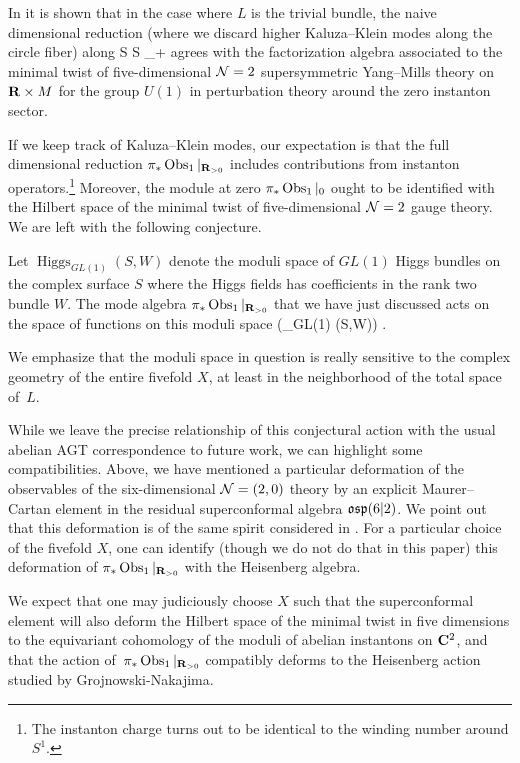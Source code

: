 In \cite{SWtensor} it is shown that in the case where $L$ is the trivial bundle, the naive dimensional reduction (where we discard higher Kaluza--Klein modes along the circle fiber) along 
\beqn
S \times \C \to S \times \R_+
\eeqn
agrees with the factorization algebra associated to the minimal twist of five-dimensional $\mathcal N = 2$ supersymmetric Yang--Mills theory on $\mathbf{R}\times M$ for the group $U(1)$ in perturbation theory around the zero instanton sector.

If we keep track of Kaluza--Klein modes, our expectation is that the full dimensional reduction $\pi_{*}\operatorname{Obs}_{1}|_{\mathbf{R}_{>0}}$ includes contributions from instanton operators.\footnote{The instanton charge turns out to be identical to the winding number around $S^1$.} Moreover, the module at zero $\pi_{*}\operatorname{Obs}_{1}|_{0}$ ought to be identified with the Hilbert space of the minimal twist of five-dimensional $\mathcal N = 2$ gauge theory. We are left with the following conjecture.

\begin{conj}
\label{conj:AGT1}
Let $\operatorname{Higgs}_{GL(1)} (S,W)$ denote the moduli space of $GL(1)$ Higgs bundles on the complex surface $S$ where the Higgs fields has coefficients in the rank two bundle $W$.
The mode algebra $\pi_{*}\operatorname{Obs}_{1}|_{\mathbf{R}_{>0}}$ that we have just discussed acts on the space of functions on this moduli space
\beqn
\cO \left(_{GL(1)} (S,W)\right) .
\eeqn
\end{conj}

We emphasize that the moduli space in question is really sensitive to the complex geometry of the entire fivefold $X$, at least in the neighborhood of the total space of~$L$.

While we leave the precise relationship of this conjectural action with the usual abelian AGT correspondence to future work, we can highlight some compatibilities. Above, we have mentioned a particular deformation of the observables of the six-dimensional $\mathcal N = (2,0)$ theory by an explicit Maurer--Cartan element in the residual superconformal algebra $\mathfrak{osp}(6|2)$. We point out that this deformation is of the same spirit considered in \cite{BeemEtAl}. For a particular choice of the fivefold $X$, one can identify (though we do not do that in this paper) this deformation of $\pi_{*} \operatorname{Obs}_1|_{\mathbf{R}_{>0}}$ with the Heisenberg algebra.

We expect that one may judiciously choose $X$ such that the superconformal element will also deform the Hilbert space of the minimal twist in five dimensions to the equivariant cohomology of the moduli of abelian instantons on $\mathbf{C}^{2}$, and that the action of~$\pi_{*}\operatorname{Obs}_{1}|_{\mathbf{R}_{>0}}$ compatibly deforms to the Heisenberg action studied by Grojnowski-Nakajima.

